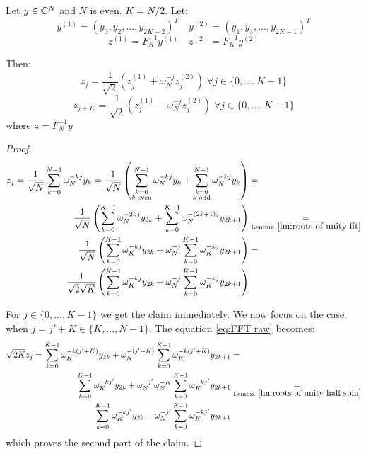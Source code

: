 \begin{theorem} \label{FFT}
	Let $y\in \mathbb{C}^N$ and $N$ is even. $K = N/2$. Let:
	\[y^{(1)} = {(y_0, y_2, ..., y_{2K-2})}^T \quad y^{(2)} = {(y_1, y_3, ..., y_{2K-1})}^T\]
	\[z^{(1)} = F_K^{-1} y^{(1)} \quad z^{(2)} = F_K^{-1} y^{(2)}\]

	Then:
	\[z_j = \frac{1}{\sqrt {2}} \left(z^{(1)}_j + \omega_N^{-j} z^{(2)}_j\right) \; \forall j\in \{0, \dots, K - 1\}\]
	\[z_{j+K} = \frac{1}{\sqrt {2}} \left(z^{(1)}_j - \omega_N^{-j} z^{(2)}_j\right) \; \forall j\in \{0, \dots, K - 1\}\]
	where $z = F_N^{-1}y$
\end{theorem}
\begin{proof}
	\begin{equation}
		\begin{aligned}
			z_j
			= \frac{1}{\sqrt N} \sum_{k=0}^{N-1} \omega_N^{-kj}y_k
			= \frac{1}{\sqrt N} \left(\sum_{\substack{k=0             \\ k\; \text{even}}}^{N-1} \omega_N^{-kj}y_k
			+ \sum_{\substack{k=0                                     \\ k\; \text{odd}}}^{N-1} \omega_N^{-kj}y_k \right)
			 & =                                                      \\ \frac{1}{\sqrt N} \left(\sum_{k=0}^{K-1} \omega_N^{-2kj}y_{2k}
			+ \sum_{k=0}^{K-1} \omega_N^{-{(2k+1)}j}y_{2k+1} \right)
			 & \underset{\text{Lemma}~\ref{lm:roots of unity fft}}{=} \\ \frac{1}{\sqrt N} \left(\sum_{k=0}^{K-1} \omega_K^{-kj}y_{2k}
			+ \omega_N^{-j}\sum_{k=0}^{K-1} \omega_K^{-kj}y_{2k+1} \right)
			 & =                                                      \\ \frac{1}{\sqrt 2\sqrt K} \left(\sum_{k=0}^{K-1} \omega_K^{-kj}y_{2k}
			+ \omega_N^{-j}\sum_{k=0}^{K-1} \omega_K^{-kj}y_{2k+1} \right)
		\end{aligned} \label{eq:FFT raw}
	\end{equation}

	For $j\in \{0, \dots, K-1\}$ we get the claim immediately. We now focus on the case, when $j = j' + K \in \{K, \dots, N-1\}$. The equation \eqref{eq:FFT raw} becomes:
	\[\begin{aligned}
			\sqrt{2K}z_j
			= \sum_{k=0}^{K-1} \omega_K^{-k(j'+K)}y_{2k} + \omega_N^{-(j'+K)}\sum_{k=0}^{K-1} \omega_K^{-k(j'+K)}y_{2k+1}
			 & =                                                            \\ \sum_{k=0}^{K-1} \omega_K^{-kj'}y_{2k}
			+ \omega_N^{-j'}\omega_N^{-K}\sum_{k=0}^{K-1} \omega_K^{-kj'}y_{2k+1}
			 & \underset{\text{Lemma}~\ref{lm:roots of unity half spin}}{=} \\ \sum_{k=0}^{K-1} \omega_K^{-kj'}y_{2k} - \omega_N^{-j'}\sum_{k=0}^{K-1} \omega_K^{-kj'}y_{2k+1}
		\end{aligned}\]
	which proves the second part of the claim.
\end{proof}

